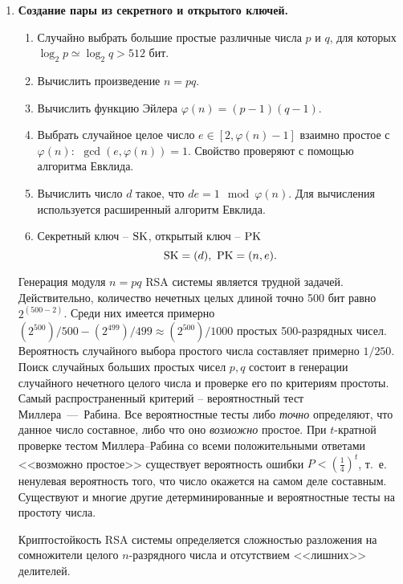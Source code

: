\begin{enumerate}
    \item \textbf{Создание пары из секретного и открытого ключей.}
        \begin{enumerate}
            \item Случайно выбрать большие простые различные числа $p$ и $q$, для которых $\log_2 p \simeq \log_2 q > 512$ бит.
            \item Вычислить произведение $n = pq$.
            \item Вычислить функцию Эйлера $\varphi(n) = (p-1)(q-1)$.
            \item Выбрать случайное целое число $e \in [2, \varphi(n)-1]$ взаимно простое с $\varphi(n)$: $~ \gcd(e, \varphi(n)) = 1$. Свойство проверяют с помощью алгоритма Евклида.
            \item Вычислить число $d$ такое, что  $d e= 1 \mod \varphi(n)$. Для вычисления используется расширенный алгоритм Евклида.
            \item Секретный ключ -- $\textrm{SK}$, открытый ключ -- $\textrm{PK}$
                \[ \textrm{SK} = (d), ~ \textrm{PK} = (n, e). \]

        \end{enumerate}

Генерация модуля $n = pq$ RSA системы является трудной задачей. Действительно, количество нечетных целых длиной точно 500 бит равно $2^{(500-2)}$. Среди них имеется примерно
$(2^{500})/500 - (2^{499})/499 \approx (2^{500})/1000$ простых 500-разрядных чисел. Вероятность случайного выбора простого числа составляет примерно $1/250 $.
Поиск случайных больших простых чисел $p,q$ состоит в генерации случайного нечетного целого числа и проверке его по критериям простоты. Самый распространенный критерий -- вероятностный тест Миллера~---~Рабина. Все вероятностные тесты либо \emph{точно} определяют, что данное число составное, либо что оно \emph{возможно} простое. При $t$-кратной проверке тестом Миллера--Рабина со всеми положительными ответами <<возможно простое>> существует вероятность ошибки $P < \left( \frac{1}{4} \right)^t$, т.~е. ненулевая вероятность того, что число окажется на самом деле составным. Существуют и многие другие детерминированные и вероятностные тесты на простоту числа.

Криптостойкость RSA системы определяется сложностью разложения на сомножители целого $n$-разрядного числа и отсутствием <<лишних>> делителей.


\end{enumerate}
